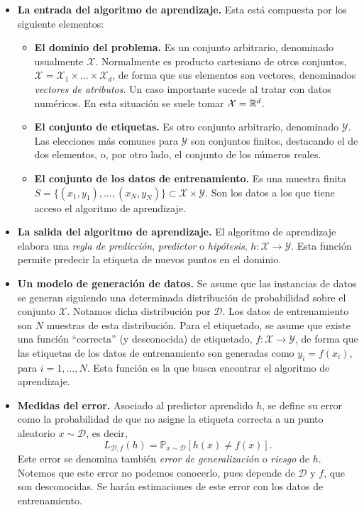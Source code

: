 \begin{itemize}
    \item \textbf{La entrada del algoritmo de aprendizaje.} Esta está compuesta por los siguiente elementos:
    \begin{itemize}
        \item \textbf{El dominio del problema.} Es un conjunto arbitrario, denominado usualmente $\mathcal{X}$. Normalmente es producto cartesiano de otros conjuntos, $\mathcal{X} = \mathcal{X}_1 \times \dots \times \mathcal{X}_d$, de forma que sus elementos son vectores, denominados \emph{vectores de atributos}. Un caso importante sucede al tratar con datos numéricos. En esta situación se suele tomar $\mathcal{X} = \mathbb{R}^d$.
        \item \textbf{El conjunto de etiquetas.} Es otro conjunto arbitrario, denominado $\mathcal{Y}$. Las elecciones más comunes para $\mathcal{Y}$ son conjuntos finitos, destacando el de dos elementos, o, por otro lado, el conjunto de los números reales.
        \item \textbf{El conjunto de los datos de entrenamiento.} Es una muestra finita $S =\{(x_1,y_1),\dots,(x_N,y_N)\} \subset \mathcal{X}\times\mathcal{Y}$. Son los datos a los que tiene acceso el algoritmo de aprendizaje.
    \end{itemize}

    \item \textbf{La salida del algoritmo de aprendizaje.} El algoritmo de aprendizaje elabora una \emph{regla de predicción}, \emph{predictor} o \emph{hipótesis}, $h\colon \mathcal{X} \to \mathcal{Y}$. Esta función permite predecir la etiqueta de nuevos puntos en el dominio.

    \item \textbf{Un modelo de generación de datos.} Se asume que las instancias de datos se generan siguiendo una determinada distribución de probabilidad sobre el conjunto $\mathcal{X}$. Notamos dicha distribución por $\mathcal{D}$. Los datos de entrenamiento son $N$ muestras de esta distribución. Para el etiquetado, se asume que existe una función ``correcta'' (y desconocida) de etiquetado, $f \colon \mathcal{X} \to \mathcal{Y}$, de forma que las etiquetas de los datos de entrenamiento son generadas como $y_i = f(x_i)$, para $i=1,\dots,N$. Esta función es la que busca encontrar el algoritmo de aprendizaje.

    \item \textbf{Medidas del error.} Asociado al predictor aprendido $h$, se define su error como la probabilidad de que no asigne la etiqueta correcta a un punto aleatorio $x \sim \mathcal{D}$, es decir,
    \[ L_{\mathcal{D},f}(h) = \mathbb{P}_{x \sim \mathcal{D}}[h(x) \ne f(x)]. \]
    Este error se denomina también \emph{error de generalización} o \emph{riesgo} de $h$. Notemos que este error no podemos conocerlo, pues depende de $\mathcal{D}$ y $f$, que son desconocidas. Se harán estimaciones de este error con los datos de entrenamiento.
\end{itemize}

